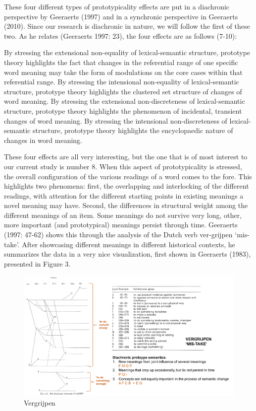 These four different types of prototypicality effects are put in a
diachronic perspective by Geeraerts (1997) and in a synchronic
perspective in Geeraerts (2010). Since our research is diachronic in
nature, we will follow the first of these two. As he relates (Geeraerts
1997: 23), the four effects are as follows (7-10):

\begin{exe}
    \ex By stressing the extensional non-equality of lexical-semantic structure, prototype theory highlights the fact that changes in the referential range of one specific word meaning may take the form of modulations on the core cases within that referential range.
    \ex By stressing the intensional non-equality of lexical-semantic structure, prototype theory highlights the clustered set structure of changes of word meaning.
    \ex By stressing the extensional non-discreteness of lexical-semantic structure, prototype theory highlights the phenomenon of incidental, transient changes of word meaning.
    \ex By stressing the intensional non-discreteness of lexical-semantic structure, prototype theory highlights the encyclopaedic nature of changes in word meaning.
\end{exe}

These four effects are all very interesting, but the one that is of most
interest to our current study is number 8. When this aspect of
prototypicality is stressed, the overall configuration of the various
readings of a word comes to the fore. This highlights two phenomena:
first, the overlapping and interlocking of the different readings, with
attention for the different starting points in existing meanings a novel
meaning may have. Second, the differences in structural weight among the
different meanings of an item. Some meanings do not survive very long,
other, more important (and prototypical) meanings persist through time.
Geeraerts (1997: 47-62) shows this through the analysis of the Dutch
verb ver-grijpen `mis-take'. After showcasing different meanings in
different historical contexts, he summarizes the data in a very nice
visualization, first shown in Geeraerts (1983), presented in Figure 3.

\begin{figure}
\centering
\includegraphics{ideos/vergrijpen.pdf}
\caption{\label{fig:levels}Vergrijpen}
\end{figure}

